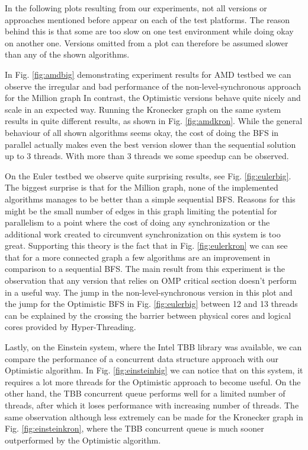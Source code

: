 \documentclass[letterpaper]{article}
\begin{document}


		In the following plots resulting from our experiments, not all versions or approaches mentioned before appear on each of the test platforms. 
		The reason behind this is that some are too slow on one test environment while doing okay on another one.
		Versions omitted from a plot can therefore be assumed slower than any of the shown algorithms.
		
		In Fig. \ref{fig:amdbig} demonstrating experiment results for AMD testbed we can observe the irregular and bad performance of the non-level-synchronous approach for the Million graph
		In contrast, the Optimistic versions behave quite nicely and scale in an expected way.
		Running the Kronecker graph on the same system results in quite different results, as shown in Fig. \ref{fig:amdkron}.
		While the general behaviour of all shown algorithms seems okay, the cost of doing the BFS in parallel actually makes even the best version slower than the sequential solution up to 3 threads.
		With more than 3 threads we some speedup can be observed. 
		
		On the Euler testbed we observe quite surprising results, see Fig. \ref{fig:eulerbig}.
		The biggest surprise is that for the Million graph, none of the implemented algorithms manages to be better than a simple sequential BFS.
		Reasons for this might be the small number of edges in this graph limiting the potential for parallelism to a point where the cost of doing any synchronization or the additional work created to circumvent synchronization on this system is too great.
		Supporting this theory is the fact that in Fig. \ref{fig:eulerkron} we can see that for a more connected graph a few algorithms are an improvement in comparison to a sequential BFS.
		The main result from this experiment is the observation that any version that relies on OMP critical section doesn't perform in a useful way.
		The jump in the non-level-synchronous version in this plot and the jump for the Optimistic BFS in Fig. \ref{fig:eulerbig} between 12 and 13 threads can be explained by the crossing the barrier between physical cores and logical cores provided by Hyper-Threading.

		Lastly, on the Einstein system, where the Intel TBB library was available, we can compare the performance of a concurrent data structure approach with our Optimistic algorithm.
		In Fig. \ref{fig:einsteinbig} we can notice that on this system, it requires a lot more threads for the Optimistic approach to become useful. On the other hand, the TBB concurrent queue performs well for a limited number of threads, after which it loses performance with increasing number of threads.		
		The same observation although less extremely can be made for the Kronecker graph in Fig. \ref{fig:einsteinkron}, where the TBB concurrent queue is much sooner outperformed by the Optimistic algorithm.
\end{document}
